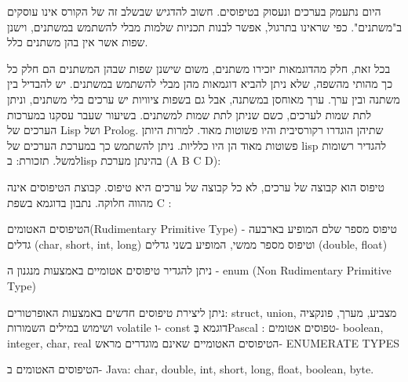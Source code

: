       היום נתעמק בערכים ונעסוק בטיפוסים. חשוב להדגיש שבשלב זה של הקורס אינו עוסקים
      ב"משתנים". כפי שראינו בתרגול, אפשר לבנות תכניות שלמות מבלי להשתמש במשתנים,
      וישנן שפות אשר אין בהן משתנים כלל.

      בכל זאת, חלק מהדוגמאות יזכירו משתנים, משום שישנן שפות שבהן המשתנים הם חלק כל כך
      מהותי מהשפה, שלא ניתן להביא דוגמאות מהן מבלי להשתמש במשתנים. יש להבדיל בין
      משתנה ובין ערך. ערך מאוחסן במשתנה, אבל גם בשפות ציוויות יש ערכים בלי משתנים,
      וניתן לתת שמות לערכים, כשם שניתן לתת שמות למשתנים. בשיעור שעבר עסקנו במערכות
      הערכים של Lisp ושל Prolog. שתיהן הוגדרו רקורסיבית והיו פשוטות מאוד. למרות היותן
      פשוטות מאוד הן היו כלליות. ניתן להשתמש כך במערכת הערכים של lisp להגדיר רשומות
      למשל.
      תזכורת: בlisp בהינתן מערכת (A B C D):

      טיפוס הוא קבוצה של ערכים, לא כל קבוצה של ערכים היא טיפוס. קבוצת הטיפוסים אינה
      מהווה חלוקה.
      נתבון בדוגמא בשפת C :
      \begin{ציינון}
\item הטיפוסים האטומים(Rudimentary Primitive Type)
      - טיפוס מספר שלם המופיע בארבעה גדלים (char,
      short, int, long) וטיפוס מספר ממשי, המופיע
      בשני גדלים (double, float)
\item ניתן להגדיר טיפוסים אטומיים באמצעות מנגנון ה
      - enum (Non Rudimentary Primitive Type)
\item ניתן ליצירת טיפוסים חדשים באמצעות האופרטורים: struct, union, מצביע, מערך, פונקציה ושימוש במילים השמורות volatile ו- const
      דוגמא בְּPascal :
      טפוסים אטומים- boolean, integer, char, real
      הטיפוסים האטומיים שאינם מוגדרים מראש- ENUMERATE TYPES
  \end{ציינון}

      הטיפוסים האטומים ב- Java:
      char, double, int, short, long, float, boolean, byte.

